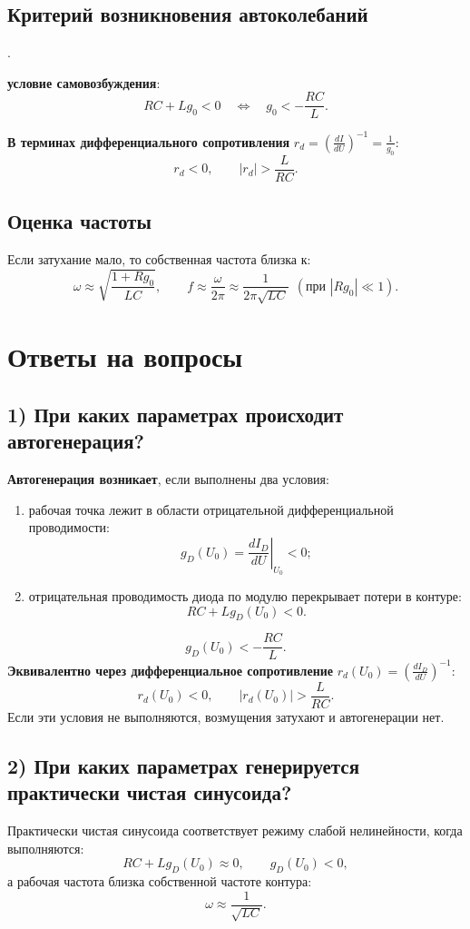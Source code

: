 \documentclass[11pt,a4paper]{article}
\begin{document}
\subsection{Критерий возникновения автоколебаний}.

\textbf{условие самовозбуждения}:
\begin{equation}
\boxed{RC + Lg_0 < 0 \quad \Longleftrightarrow\quad g_0 < -\frac{RC}{L}.}
\end{equation}

\textbf{В терминах дифференциального сопротивления} $r_d=\left(\frac{dI}{dU}\right)^{-1}=\frac{1}{g_0}$:
\[
r_d<0,\qquad |r_d|>\frac{L}{RC}.
\]

\subsection{Оценка частоты}
Если затухание мало, то собственная частота близка к:
\begin{equation}
\omega \approx \sqrt{\frac{1+Rg_0}{LC}},\qquad
f\approx \frac{\omega}{2\pi}\approx \frac{1}{2\pi\sqrt{LC}}\ \ (\text{при }|Rg_0|\ll 1).
\end{equation}

\section{Ответы на вопросы}

\subsection{1) При каких параметрах происходит автогенерация?}
\textbf{Автогенерация возникает}, если выполнены два условия:
\begin{enumerate}[leftmargin=6mm]
    \item рабочая точка лежит в области отрицательной дифференциальной проводимости:
    \[
    g_D(U_0)=\left.\frac{dI_D}{dU}\right|_{U_0}<0;
    \]
    \item отрицательная проводимость диода по модулю перекрывает потери в контуре:
    \[
    RC+Lg_D(U_0)<0.
    \]
\end{enumerate}
\[
\boxed{g_D(U_0)<-\frac{RC}{L}.}
\]
\textbf{Эквивалентно через дифференциальное сопротивление}
$r_d(U_0)=\left(\frac{dI_D}{dU}\right)^{-1}$:
\[
\boxed{r_d(U_0)<0,\qquad |r_d(U_0)|>\frac{L}{RC}.}
\]
Если эти условия не выполняются, возмущения затухают и автогенерации нет.

\subsection{2) При каких параметрах генерируется практически чистая синусоида?}
Практически чистая синусоида соответствует режиму слабой нелинейности, когда выполняются:
\[
RC+Lg_D(U_0)\approx 0,\qquad g_D(U_0)<0,
\]
а рабочая частота близка собственной частоте контура:
\[
\omega\approx\frac{1}{\sqrt{LC}}.
\]
\end{document}
